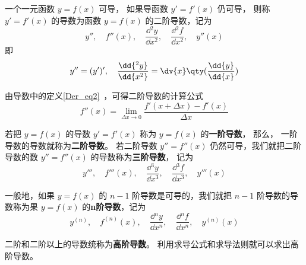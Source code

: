 
\begin{issues}
\end{issues}


一个一元函数 $y=f(x)$ 可导， 如果导函数 $y'=f'(x)$ 仍可导， 则称 $y'=f'(x)$ 的导数为函数 $y=f(x)$ 的二阶导数，记为
\begin{equation}
y'',\quad f''(x),\quad \frac{\dd{^2y}}{\dd{x^2}},\quad \frac{\dd{^2f}}{\dd{x^2}},\quad y''(x)
\end{equation}
即
\begin{equation}
y''=(y')',\quad\frac{\dd{^2y}}{\dd{x^2}}=\dv{x}\qty(\frac{\dd{y}}{\dd{x}})
\end{equation}

由导数中的定义\autoref{Der_eq2}~，可得二阶导数的计算公式
\begin{equation}
f''(x)=\lim_{\Delta x \to 0} \frac{f'(x+ \Delta x)-f'(x)}{\Delta x}
\end{equation}

若把 $y=f(x)$ 的导数 $y'=f'(x)$ 称为 $y=f(x)$ 的\textbf{一阶导数}， 那么， 一阶导数的导数就称为\textbf{二阶导数}。 若二阶导数 $y''=f''(x)$ 仍然可导，我们就把二阶导数的数 $y''=f''(x)$ 的导数称为\textbf{三阶导数}， 记为
\begin{equation}
y''',\quad f'''(x),\quad \frac{\dd{^3y}}{\dd{x^3}},\quad \frac{\dd{^3f}}{\dd{x^3}},\quad y'''(x)
\end{equation}

一般地，如果 $y=f(x)$ 的 $n-1$ 阶导数是可导的，我们就把 $n-1$ 阶导数的导数称为果 $y=f(x)$ 的\textbf{n阶导数}，记为
\begin{equation}
y^{(n)},\quad f^{(n)}(x),\quad \frac{\dd{^ny}}{\dd{x^n}},\quad \frac{\dd{^nf}}{\dd{x^n}},\quad y^{(n)}(x)
\end{equation}

二阶和二阶以上的导数统称为\textbf{高阶导数}。 利用求导公式和求导法则就可以求出高阶导数。

